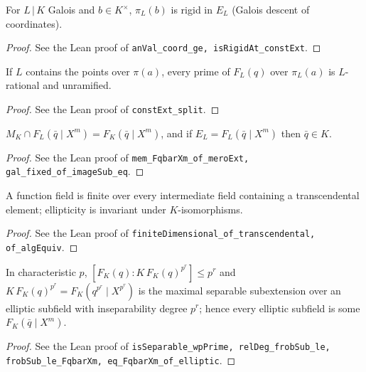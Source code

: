 \begin{lemma}
\label{lem:const-rigid}
\leanok
For $L\,|\,K$ Galois and $b\in K^\times$, $\pi_L(b)$ is rigid in $E_L$ (Galois descent of coordinates).
\end{lemma}
\begin{proof}
\leanok
See the Lean proof of \texttt{anVal\_coord\_ge, isRigidAt\_constExt}.
\end{proof}

\begin{lemma}
\label{lem:const-split}
\leanok
If $L$ contains the points over $\pi(a)$, every prime of $F_L(q)$ over $\pi_L(a)$ is $L$-rational and unramified.
\end{lemma}
\begin{proof}
\leanok
See the Lean proof of \texttt{constExt\_split}.
\end{proof}

\begin{lemma}
\label{lem:const-descent}
\leanok
$M_K\cap F_L(\bar q\mid X^m)=F_K(\bar q\mid X^m)$, and if $E_L=F_L(\bar q\mid X^m)$ then $\bar q\in K$.
\end{lemma}
\begin{proof}
\leanok
See the Lean proof of \texttt{mem\_FqbarXm\_of\_meroExt, gal\_fixed\_of\_imageSub\_eq}.
\end{proof}

\begin{lemma}
\label{lem:ff-finite}
\leanok
A function field is finite over every intermediate field containing a transcendental element; ellipticity is invariant under $K$-isomorphisms.
\end{lemma}
\begin{proof}
\leanok
See the Lean proof of \texttt{finiteDimensional\_of\_transcendental, of\_algEquiv}.
\end{proof}

\begin{lemma}
\label{lem:XVIII-insep}
\leanok
In characteristic $p$, $[F_K(q):K\,F_K(q)^{p^r}]\le p^r$ and $K\,F_K(q)^{p^r}=F_K(q^{p^r}\mid X^{p^r})$ is the maximal separable subextension over an elliptic subfield with inseparability degree $p^r$; hence every elliptic subfield is some $F_K(\bar q\mid X^m)$.
\end{lemma}
\begin{proof}
\leanok
See the Lean proof of \texttt{isSeparable\_wpPrime, relDeg\_frobSub\_le, frobSub\_le\_FqbarXm, eq\_FqbarXm\_of\_elliptic}.
\end{proof}

